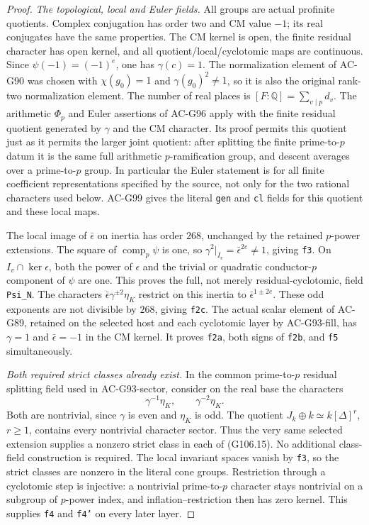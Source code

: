 \begin{proof}
\emph{The topological, local and Euler fields.}
All groups are actual profinite quotients.  Complex conjugation
has order two and CM value \(-1\); its real conjugates have the
same properties.  The CM kernel is open, the finite residual
character has open kernel, and all quotient/local/cyclotomic maps
are continuous.  Since \(\psi(-1)=(-1)^e\), one has
\(\gamma(c)=1\).  The normalization element of AC-G90 was chosen
with \(\chi(g_0)=1\) and \(\gamma(g_0)^2\ne1\), so it is also
the original rank-two normalization element.  The number of real
places is \([F:\mathbb Q]=\sum_{v\mid p}d_v\).
The arithmetic \(\Phi_p\) and Euler assertions of AC-G96 apply
with the finite residual quotient generated by \(\gamma\) and
the CM character.  Its proof permits this quotient just as it
permits the larger joint quotient: after splitting the finite
prime-to-\(p\) datum it is the same full arithmetic
\(p\)-ramification group, and descent averages over a
prime-to-\(p\) group.  In particular the Euler statement is for
all finite coefficient representations specified by the source,
not only for the two rational characters used below.
AC-G99 gives the literal \texttt{gen} and \texttt{cl} fields for
this quotient and these local maps.

The local image of \(\bar\epsilon\) on inertia has order
\(268\), unchanged by the retained \(p\)-power extensions.
The square of \(\operatorname{comp}_p\psi\) is one, so
\(\gamma^2|_{I_v}=\bar\epsilon^{2e}\ne1\), giving
\texttt{f3}.  On \(I_v\cap\ker\epsilon\), both the power of
\(\epsilon\) and the trivial or quadratic conductor-\(p\)
component of \(\psi\) are one.  This proves the full, not merely
residual-cyclotomic, field \texttt{Psi\_N}.
The characters \(\bar\epsilon\gamma^{\pm2}\eta_K\)
restrict on this inertia to \(\bar\epsilon^{1\pm2e}\).
These odd exponents are not divisible by \(268\), giving
\texttt{f2c}.  The actual scalar element of AC-G89, retained
on the selected host and each cyclotomic layer by AC-G93-fill,
has \(\gamma=1\) and \(\bar\epsilon=-1\) in the CM kernel.
It proves \texttt{f2a}, both signs of \texttt{f2b}, and
\texttt{f5} simultaneously.

\emph{Both required strict classes already exist.}
In the common prime-to-\(p\) residual splitting field used in
AC-G93-sector, consider on the real base the characters
\[
                   \gamma^{-1}\eta_K,
                    \qquad \gamma^{-2}\eta_K.
 \tag{G106.15}
\]
Both are nontrivial, since \(\gamma\) is even and \(\eta_K\)
is odd.  The quotient
\(J_k\oplus k\simeq k[\Delta]^r\), \(r\ge1\), contains every
nontrivial character sector.  Thus the very same selected extension
supplies a nonzero strict class in each of (G106.15).
No additional class-field construction is required.
The local invariant spaces vanish by \texttt{f3}, so the strict
classes are nonzero in the literal cone groups.
Restriction through a cyclotomic step is injective: a nontrivial
prime-to-\(p\) character stays nontrivial on a subgroup of
\(p\)-power index, and inflation--restriction then has zero kernel.
This supplies \texttt{f4} and \texttt{f4'} on every later layer.


\end{proof}
